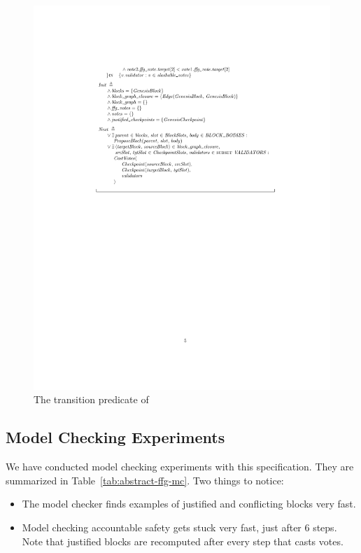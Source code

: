 \begin{figure}
    \centering
    \includegraphics[width=\textwidth]{images/abstract-ffg-next.pdf}  %
    \caption{The transition predicate of~\SpecThree{}}\label{fig:abstract-ffg-next}
\end{figure}

\subsection{Model Checking Experiments}

We have conducted model checking experiments with this specification. They are
summarized in Table~\ref{tab:abstract-ffg-mc}. Two things to notice:

\begin{itemize}

  \item The model checker finds examples of justified and conflicting blocks
    very fast.

  \item Model checking accountable safety gets stuck very fast, just after 6
    steps. Note that justified blocks are recomputed after every step that
    casts votes.

\end{itemize}

